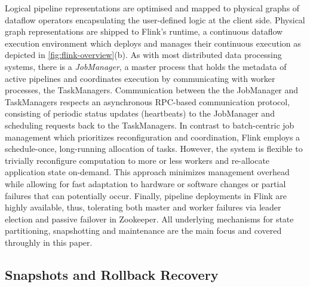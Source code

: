 Logical pipeline representations are optimised and mapped to physical graphs of dataflow operators encapsulating the user-defined logic at the client side. Physical graph representations are shipped to Flink's runtime, a continuous dataflow execution environment which deploys and manages their continuous execution as depicted in \autoref{fig:flink-overview}(b). As with most distributed data processing systems, there is a \emph{JobManager}, a master process that holds the metadata of active pipelines and coordinates execution by communicating with worker processes, the TaskManagers. Communication between the the JobManager and TaskManagers respects an asynchronous RPC-based communication protocol, consisting of periodic status updates (heartbeats) to the JobManager and scheduling requests back to the TaskManagers. In contrast to batch-centric job management \cite{zaharia2012discretized,venkataramandrizzle} which prioritizes reconfiguration and coordination, Flink employs a schedule-once, long-running allocation of tasks. However, the system is flexible to trivially reconfigure computation to more or less workers and re-allocate application state on-demand. This approach minimizes management overhead while allowing for fast adaptation to hardware or software changes or partial failures that can potentially occur. Finally, pipeline deployments in Flink are highly available, thus, tolerating both master and worker failures via leader election and passive failover in Zookeeper. All underlying mechanisms for state partitioning, snapshotting and maintenance are the main focus and covered throughly in this paper.


\subsection{Snapshots and Rollback Recovery}
